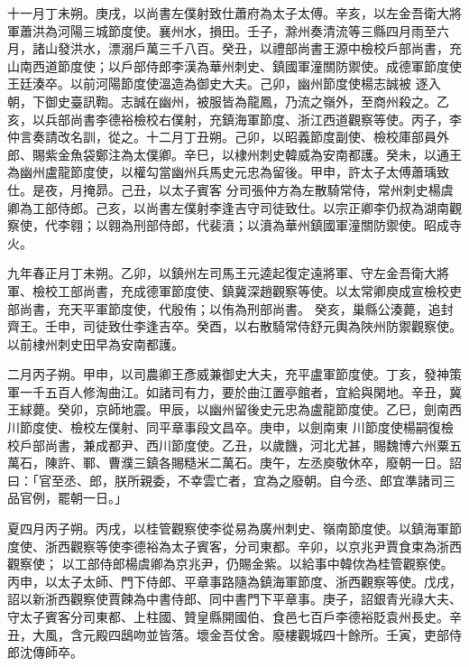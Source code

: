 \begin{pinyinscope}
 十一月丁未朔。庚戌，以尚書左僕射致仕蕭府為太子太傅。辛亥，以左金吾衛大將軍蕭洪為河陽三城節度使。襄州水，損田。壬子，滁州奏清流等三縣四月雨至六月，諸山發洪水，漂溺戶萬三千八百。癸丑，以禮部尚書王源中檢校戶部尚書，充山南西道節度使；以戶部侍郎李漢為華州刺史、鎮國軍潼關防禦使。成德軍節度使王廷湊卒。以前河陽節度使溫造為御史大夫。己卯，幽州節度使楊志誠被
 逐入朝，下御史臺訊鞫。志誠在幽州，被服皆為龍鳳，乃流之嶺外，至商州殺之。乙亥，以兵部尚書李德裕檢校右僕射，充鎮海軍節度、浙江西道觀察等使。丙子，李仲言奏請改名訓，從之。十二月丁丑朔。己卯，以昭義節度副使、檢校庫部員外郎、賜紫金魚袋鄭注為太僕卿。辛巳，以棣州刺史韓威為安南都護。癸未，以通王為幽州盧龍節度使，以權勾當幽州兵馬史元忠為留後。甲申，許太子太傅蕭瑀致仕。是夜，月掩昴。己丑，以太子賓客
 分司張仲方為左散騎常侍，常州刺史楊虞卿為工部侍郎。己亥，以尚書左僕射李逢吉守司徒致仕。以宗正卿李仍叔為湖南觀察使，代李翱；以翱為刑部侍郎，代裴濆；以濆為華州鎮國軍潼關防禦使。昭成寺火。



 九年春正月丁未朔。乙卯，以鎮州左司馬王元逵起復定遠將軍、守左金吾衛大將軍、檢校工部尚書，充成德軍節度使、鎮冀深趙觀察等使。以太常卿庾成宣檢校吏部尚書，充天平軍節度使，代殷侑；以侑為刑部尚書。
 癸亥，巢縣公湊薨，追封齊王。壬申，司徒致仕李逢吉卒。癸酉，以右散騎常侍舒元輿為陜州防禦觀察使。以前棣州刺史田早為安南都護。



 二月丙子朔。甲申，以司農卿王彥威兼御史大夫，充平盧軍節度使。丁亥，發神策軍一千五百人修淘曲江。如諸司有力，要於曲江置亭館者，宜給與閑地。辛丑，冀王絿薨。癸卯，京師地震。甲辰，以幽州留後史元忠為盧龍節度使。乙巳，劍南西川節度使、檢校左僕射、同平章事段文昌卒。庚申，以劍南東
 川節度使楊嗣復檢校戶部尚書，兼成都尹、西川節度使。乙丑，以歲饑，河北尤甚，賜魏博六州粟五萬石，陳許、鄆、曹濮三鎮各賜糙米二萬石。庚午，左丞庾敬休卒，廢朝一日。詔曰：「官至丞、郎，朕所親委，不幸雲亡者，宜為之廢朝。自今丞、郎宜準諸司三品官例，罷朝一日。」



 夏四月丙子朔。丙戌，以桂管觀察使李從易為廣州刺史、嶺南節度使。以鎮海軍節度使、浙西觀察等使李德裕為太子賓客，分司東都。辛卯，以京兆尹賈食束為浙西觀察使；
 以工部侍郎楊虞卿為京兆尹，仍賜金紫。以給事中韓佽為桂管觀察使。丙申，以太子太師、門下侍郎、平章事路隨為鎮海軍節度、浙西觀察等使。戊戌，詔以新浙西觀察使賈餗為中書侍郎、同中書門下平章事。庚子，詔銀青光祿大夫、守太子賓客分司東都、上柱國、贊皇縣開國伯、食邑七百戶李德裕貶袁州長史。辛丑，大風，含元殿四鴟吻並皆落。壞金吾仗舍。廢樓觀城四十餘所。壬寅，吏部侍郎沈傳師卒。




\end{pinyinscope}

